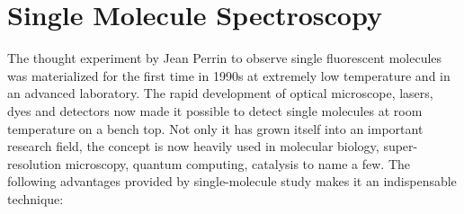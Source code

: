 \section{Single Molecule Spectroscopy}
The thought experiment by Jean Perrin to observe single fluorescent molecules was materialized for the first time in 1990s at extremely low temperature and in an advanced laboratory.\cite{orrit1990single}
The rapid development of optical microscope, lasers, dyes and detectors now made it possible to detect single molecules at room temperature on a bench top.\cite{xie1998optical,weiss1999fluorescence,moerner1999illuminating}
Not only it has grown itself into an important research field, the concept is now heavily used in molecular biology, super-resolution microscopy, quantum computing, catalysis to name a few.\cite{zhuang2000a,huang2008threedimensional,eisaman2011invited,lounis2005singlephoton,roeffaers2007singlemolecule}
The following advantages provided by single-molecule study makes it an indispensable technique:
